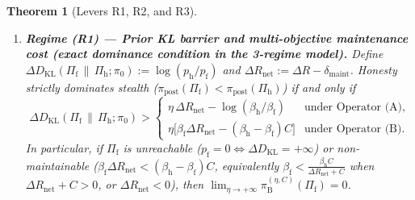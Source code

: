 \documentclass[11pt,a4paper]{article}
\newtheorem{theorem}{Theorem}
\newcommand{\DKL}{D_{\mathrm{KL}}}
\begin{document}
\begin{theorem}[Levers R1, R2, and R3]\label{thm:escape}
\leavevmode
\begin{enumerate}
  \item \textbf{Regime (R1) --- Prior KL barrier and multi-objective maintenance cost (exact dominance condition in the 3-regime model).} Define $\Delta \DKL(\Pi_{\mathrm{f}} \,\|\, \Pi_{\mathrm{h}}; \pi_0) := \log(p_{\mathrm{h}}/p_{\mathrm{f}})$ and $\Delta R_{\mathrm{net}} := \Delta R - \delta_{\mathrm{maint}}$. Honesty strictly dominates stealth ($\pi_{\mathrm{post}}(\Pi_{\mathrm{f}}) < \pi_{\mathrm{post}}(\Pi_{\mathrm{h}})$) if and only if
  \begin{equation}\label{eq:R1}
    \Delta \DKL(\Pi_{\mathrm{f}} \,\|\, \Pi_{\mathrm{h}}; \pi_0) >
    \begin{cases}
      \eta\,\Delta R_{\mathrm{net}} - \log(\beta_{\mathrm{h}}/\beta_{\mathrm{f}}) & \text{under Operator~(A)}, \\[4pt]
      \eta\big[\beta_{\mathrm{f}}\Delta R_{\mathrm{net}} - (\beta_{\mathrm{h}} - \beta_{\mathrm{f}})C\big] & \text{under Operator~(B)}.
    \end{cases}
  \end{equation}
  In particular, if $\Pi_{\mathrm{f}}$ is unreachable ($p_{\mathrm{f}} = 0 \iff \Delta \DKL = +\infty$) or non-maintainable ($\beta_{\mathrm{f}}\Delta R_{\mathrm{net}} < (\beta_{\mathrm{h}} - \beta_{\mathrm{f}})C$, equivalently $\beta_{\mathrm{f}} < \frac{\beta_{\mathrm{h}} C}{\Delta R_{\mathrm{net}} + C}$ when $\Delta R_{\mathrm{net}} + C > 0$, or $\Delta R_{\mathrm{net}} < 0$), then $\lim_{\eta \to +\infty}\pi_{\mathrm{B}}^{(\eta, C)}(\Pi_{\mathrm{f}}) = 0$.


\end{enumerate}
\end{theorem}
\end{document}
